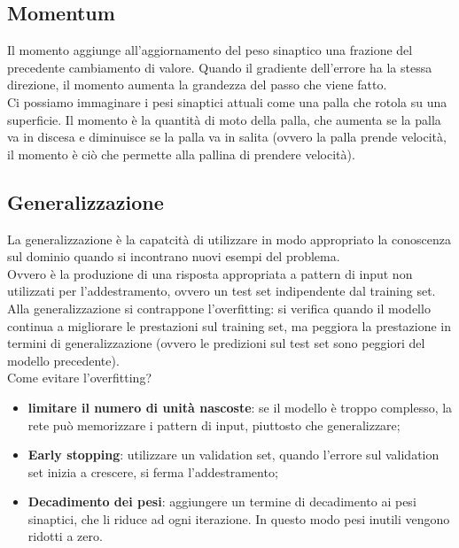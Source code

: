\subsection{Momentum}

Il momento aggiunge all'aggiornamento del peso sinaptico una frazione del
precedente cambiamento di valore. Quando il gradiente dell'errore ha la stessa
direzione, il momento aumenta la grandezza del passo che viene fatto.\\
Ci possiamo immaginare i pesi sinaptici attuali come una palla che rotola su una
superficie. Il momento è la quantità di moto della palla, che aumenta se la
palla va in discesa e diminuisce se la palla va in salita (ovvero la palla
prende velocità, il momento è ciò che permette alla pallina di prendere
velocità).

\subsection{Generalizzazione}

La generalizzazione è la capatcità di utilizzare in modo appropriato la
conoscenza sul dominio quando si incontrano nuovi esempi del problema.\\
Ovvero è la produzione di una risposta appropriata a pattern di input non
utilizzati per l'addestramento, ovvero un test set indipendente dal training
set.\\
Alla generalizzazione si contrappone l'overfitting: si verifica quando il
modello continua a migliorare le prestazioni sul training set, ma peggiora la
prestazione in termini di generalizzazione (ovvero le predizioni sul test set
sono peggiori del modello precedente).\\
Come evitare l'overfitting?
\begin{itemize}
	\item \textbf{limitare il numero di unità nascoste}: se il modello è troppo 
		complesso, la rete può memorizzare i pattern di input, piuttosto che 
		generalizzare;

	\item \textbf{Early stopping}: utilizzare un validation set, quando l'errore
		sul validation set inizia a crescere, si ferma l'addestramento;

	\item \textbf{Decadimento dei pesi}: aggiungere un termine di decadimento
		ai pesi sinaptici, che li riduce ad ogni iterazione. In questo modo pesi
		inutili vengono ridotti a zero.
\end{itemize}


